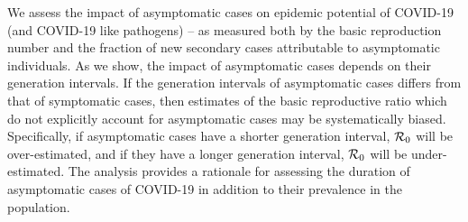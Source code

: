{\footnotesize We assess the impact of asymptomatic cases on epidemic potential of COVID-19 (and COVID-19 like pathogens) -- as measured both by the basic reproduction
number and the fraction of new secondary cases attributable to asymptomatic
individuals. As we show, the impact of asymptomatic
cases depends on their generation intervals.  
If the generation intervals of asymptomatic cases differs from that 
of symptomatic cases, then estimates of the basic reproductive ratio which do not explicitly account for asymptomatic cases may be systematically biased. Specifically, if asymptomatic cases have a shorter generation interval, 
${\cal{R}}_0$ will be over-estimated, and if they have a longer generation interval, ${\cal{R}}_0$ will be under-estimated.
The analysis provides a rationale for assessing the duration of asymptomatic cases 
of COVID-19 in addition to their prevalence in the population.
}
